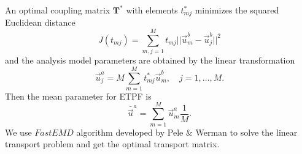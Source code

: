 \documentclass[12, a4paper]{article}
\numberwithin{equation}{section}
\begin{document}
An optimal coupling matrix $\textbf{T}^{*}$  with elements $t_{mj}^{*}$ minimizes the squared Euclidean distance 
\begin{equation}\label{T}
J(t_{mj}) = \sum_{m,j=1}^{M} t_{mj} ||\vec{u}_m^b-\vec{u}_j^b ||^2 
\end{equation}
and the analysis model parameters are obtained by the linear transformation 
\begin{equation} \label{Zana}
\vec{u}_j^a = M\sum_{m=1}^{M} t_{mj}^*\vec{u}_m^b ,   \quad j = 1,\hdots,M.
\end{equation}
Then the mean parameter for ETPF is 
\[
\bar{\vec{u}}^a = \sum_{m=1}^M\vec{u}_m^a \frac{1}{M}.
\]
We use $FastEMD$ algorithm developed by Pele $\&$ Werman \cite{PeWe09} to solve the linear transport problem and get the optimal transport matrix. 
\end{document}
